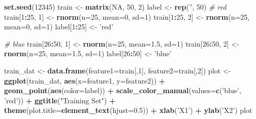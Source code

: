 \documentclass[]{article}
\newenvironment{Shaded}{\begin{snugshade}}{\end{snugshade}}
\newcommand{\CommentTok}[1]{\textcolor[rgb]{0.56,0.35,0.01}{\textit{#1}}}
\newcommand{\DataTypeTok}[1]{\textcolor[rgb]{0.13,0.29,0.53}{#1}}
\newcommand{\DecValTok}[1]{\textcolor[rgb]{0.00,0.00,0.81}{#1}}
\newcommand{\FloatTok}[1]{\textcolor[rgb]{0.00,0.00,0.81}{#1}}
\newcommand{\KeywordTok}[1]{\textcolor[rgb]{0.13,0.29,0.53}{\textbf{#1}}}
\newcommand{\NormalTok}[1]{#1}
\newcommand{\OperatorTok}[1]{\textcolor[rgb]{0.81,0.36,0.00}{\textbf{#1}}}
\newcommand{\OtherTok}[1]{\textcolor[rgb]{0.56,0.35,0.01}{#1}}
\newcommand{\StringTok}[1]{\textcolor[rgb]{0.31,0.60,0.02}{#1}}
\begin{document}
\begin{Shaded}
\begin{Highlighting}[]
\KeywordTok{set.seed}\NormalTok{(}\DecValTok{12345}\NormalTok{)}
\NormalTok{train <-}\StringTok{ }\KeywordTok{matrix}\NormalTok{(}\OtherTok{NA}\NormalTok{, }\DecValTok{50}\NormalTok{, }\DecValTok{2}\NormalTok{)}
\NormalTok{label <-}\StringTok{ }\KeywordTok{rep}\NormalTok{(}\StringTok{''}\NormalTok{, }\DecValTok{50}\NormalTok{)}
\CommentTok{# red}
\NormalTok{train[}\DecValTok{1}\OperatorTok{:}\DecValTok{25}\NormalTok{, }\DecValTok{1}\NormalTok{] <-}\StringTok{ }\KeywordTok{rnorm}\NormalTok{(}\DataTypeTok{n=}\DecValTok{25}\NormalTok{, }\DataTypeTok{mean=}\DecValTok{0}\NormalTok{, }\DataTypeTok{sd=}\DecValTok{1}\NormalTok{)}
\NormalTok{train[}\DecValTok{1}\OperatorTok{:}\DecValTok{25}\NormalTok{, }\DecValTok{2}\NormalTok{] <-}\StringTok{ }\KeywordTok{rnorm}\NormalTok{(}\DataTypeTok{n=}\DecValTok{25}\NormalTok{, }\DataTypeTok{mean=}\DecValTok{0}\NormalTok{, }\DataTypeTok{sd=}\DecValTok{1}\NormalTok{)}
\NormalTok{label[}\DecValTok{1}\OperatorTok{:}\DecValTok{25}\NormalTok{] <-}\StringTok{ 'red'}

\CommentTok{# blue}
\NormalTok{train[}\DecValTok{26}\OperatorTok{:}\DecValTok{50}\NormalTok{, }\DecValTok{1}\NormalTok{] <-}\StringTok{ }\KeywordTok{rnorm}\NormalTok{(}\DataTypeTok{n=}\DecValTok{25}\NormalTok{, }\DataTypeTok{mean=}\FloatTok{1.5}\NormalTok{, }\DataTypeTok{sd=}\DecValTok{1}\NormalTok{)}
\NormalTok{train[}\DecValTok{26}\OperatorTok{:}\DecValTok{50}\NormalTok{, }\DecValTok{2}\NormalTok{] <-}\StringTok{ }\KeywordTok{rnorm}\NormalTok{(}\DataTypeTok{n=}\DecValTok{25}\NormalTok{, }\DataTypeTok{mean=}\FloatTok{1.5}\NormalTok{, }\DataTypeTok{sd=}\DecValTok{1}\NormalTok{)}
\NormalTok{label[}\DecValTok{26}\OperatorTok{:}\DecValTok{50}\NormalTok{] <-}\StringTok{ 'blue'}

\NormalTok{train_dat <-}\StringTok{ }\KeywordTok{data.frame}\NormalTok{(}\DataTypeTok{feature1=}\NormalTok{train[,}\DecValTok{1}\NormalTok{], }\DataTypeTok{feature2=}\NormalTok{train[,}\DecValTok{2}\NormalTok{])}
\NormalTok{plot <-}\StringTok{ }\KeywordTok{ggplot}\NormalTok{(train_dat, }\KeywordTok{aes}\NormalTok{(}\DataTypeTok{x=}\NormalTok{feature1, }\DataTypeTok{y=}\NormalTok{feature2)) }\OperatorTok{+}\StringTok{ }\KeywordTok{geom_point}\NormalTok{(}\KeywordTok{aes}\NormalTok{(}\DataTypeTok{color=}\NormalTok{label)) }\OperatorTok{+}\StringTok{ }\KeywordTok{scale_color_manual}\NormalTok{(}\DataTypeTok{values=}\KeywordTok{c}\NormalTok{(}\StringTok{'blue'}\NormalTok{, }\StringTok{'red'}\NormalTok{)) }\OperatorTok{+}\StringTok{ }\KeywordTok{ggtitle}\NormalTok{(}\StringTok{"Training Set"}\NormalTok{) }\OperatorTok{+}\StringTok{ }\KeywordTok{theme}\NormalTok{(}\DataTypeTok{plot.title=}\KeywordTok{element_text}\NormalTok{(}\DataTypeTok{hjust=}\FloatTok{0.5}\NormalTok{)) }\OperatorTok{+}\StringTok{ }\KeywordTok{xlab}\NormalTok{(}\StringTok{'X1'}\NormalTok{) }\OperatorTok{+}\StringTok{ }\KeywordTok{ylab}\NormalTok{(}\StringTok{'X2'}\NormalTok{)}
\NormalTok{plot}
\end{Highlighting}
\end{Shaded}
\end{document}
